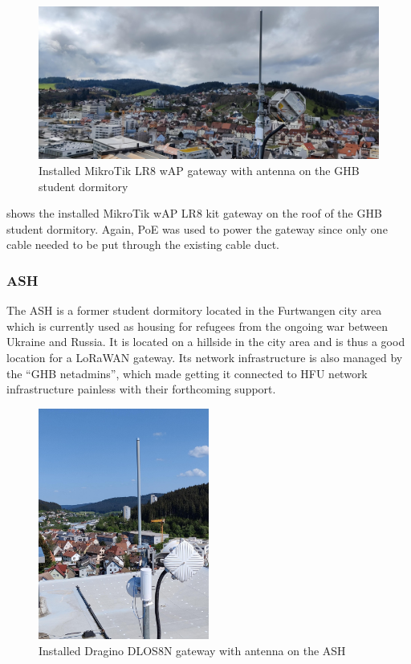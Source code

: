 \begin{figure}
    \centering
    \includegraphics[width=1\textwidth]{pictures/hardware/gateway-deployment/lr8_ghb_installation.jpg}
    \caption{Installed MikroTik LR8 wAP gateway with antenna on the \ac{GHB} student dormitory\label{pic:mikrotik-gateway-ghb-installation}}
\end{figure}

 shows the installed MikroTik wAP LR8 kit gateway on the roof of the \ac{GHB} student dormitory.
Again, \ac{PoE} was used to power the gateway since only one cable needed to be put through the existing cable duct.

\subsubsection{\acf{ASH}}

The \ac{ASH} is a former student dormitory located in the Furtwangen city area which is currently used as housing for refugees from the ongoing war between Ukraine and Russia.
It is located on a hillside in the city area and is thus a good location for a \ac{LoRaWAN} gateway.
Its network infrastructure is also managed by the ``\ac{GHB} netadmins'', which made getting it connected to \ac{HFU} network infrastructure painless with their forthcoming support.

\begin{figure}
    \centering
    \includegraphics[width=0.5\textwidth]{pictures/hardware/gateway-deployment/gateway_ash.jpg}
    \caption{Installed Dragino DLOS8N gateway with antenna on the \acf{ASH}\label{pic:dragino-gateway-ash}}
\end{figure}


